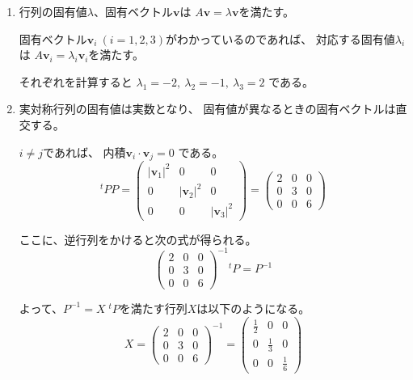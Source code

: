 \documentclass[12pt,b5paper]{ltjsarticle}
\begin{document}
\begin{description}
\begin{enumerate}
        \item
             行列の固有値$\lambda$、固有ベクトル$\bm{v}$は
             $A\bm{v}=\lambda\bm{v}$を満たす。

             固有ベクトル$\bm{v}_{i} \ (i=1,2,3)$がわかっているのであれば、
             対応する固有値$\lambda_{i}$は
             $A\bm{v}_{i}=\lambda_{i}\bm{v}_{i}$を満たす。

             それぞれを計算すると
             $\lambda_{1}=-2,\ \lambda_{2}=-1,\ \lambda_{3}=2$
             である。


        \item
             実対称行列の固有値は実数となり、
             固有値が異なるときの固有ベクトルは直交する。

             $i\ne j$であれば、
             内積$\bm{v}_{i}\cdot\bm{v}_{j}=0$
             である。
             \begin{equation}
              {}^{t}\!P P =
              \begin{pmatrix}
               \lvert \bm{v}_{1} \rvert^{2} & 0 & 0 \\
               0 & \lvert \bm{v}_{2} \rvert^{2} & 0 \\
               0 & 0 & \lvert \bm{v}_{3} \rvert^{2}
              \end{pmatrix}
              =
              \begin{pmatrix}
               2 & 0 & 0 \\
               0 & 3 & 0 \\
               0 & 0 & 6
              \end{pmatrix}
             \end{equation}

             ここに、逆行列をかけると次の式が得られる。
             \begin{equation}
              \begin{pmatrix}
               2 & 0 & 0 \\
               0 & 3 & 0 \\
               0 & 0 & 6
              \end{pmatrix}^{-1}
              {}^{t}\!P
              = P^{-1}
             \end{equation}

             よって、$P^{-1}=X\;{}^{t}P$を満たす行列$X$は以下のようになる。
             \begin{equation}
              X=
              \begin{pmatrix}
               2 & 0 & 0 \\
               0 & 3 & 0 \\
               0 & 0 & 6
              \end{pmatrix}^{-1}
              =
              \begin{pmatrix}
               \frac{1}{2} & 0 & 0 \\
               0 & \frac{1}{3} & 0 \\
               0 & 0 & \frac{1}{6}
              \end{pmatrix}
             \end{equation}



\end{enumerate}
\end{description}
\end{document}
